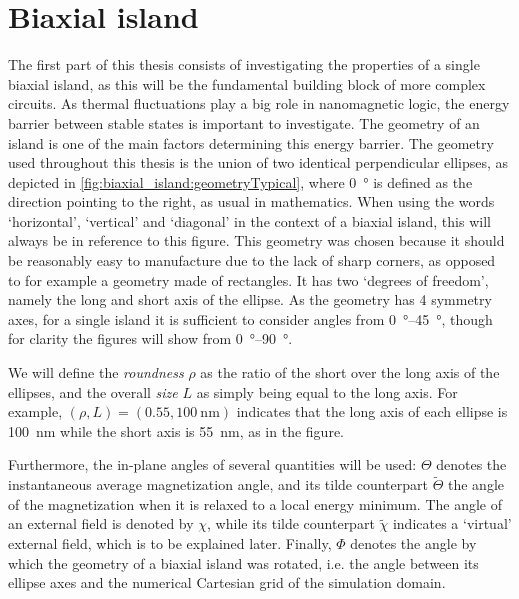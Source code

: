 \documentclass[11pt,a4paper,english]{article}
\begin{document}
\section{Biaxial island}
\label{par:Biaxial_island}
The first part of this thesis consists of investigating the properties of a single biaxial island, as this will be the fundamental building block of more complex circuits. As thermal fluctuations play a big role in nanomagnetic logic, the energy barrier between stable states is important to investigate. The geometry of an island is one of the main factors determining this energy barrier. The geometry used throughout this thesis is the union of two identical perpendicular ellipses, as depicted in \cref{fig:biaxial_island:geometryTypical}, where \SI{0}{\degree} is defined as the direction pointing to the right, as usual in mathematics. When using the words `horizontal', `vertical' and `diagonal' in the context of a biaxial island, this will always be in reference to this figure. This geometry was chosen because it should be reasonably easy to manufacture due to the lack of sharp corners, as opposed to for example a geometry made of rectangles. It has two `degrees of freedom', namely the long and short axis of the ellipse. As the geometry has 4 symmetry axes, for a single island it is sufficient to consider angles from \SIrange{0}{45}{\degree}, though for clarity the figures will show from \SIrange{0}{90}{\degree}. \par
We will define the \textit{roundness} $\rho$ as the ratio of the short over the long axis of the ellipses, and the overall \textit{size} $L$ as simply being equal to the long axis. For example, $(\rho, L)=(0.55, \SI{100}{\nano\metre})$ indicates that the long axis of each ellipse is \SI{100}{\nano\metre} while the short axis is \SI{55}{\nano\metre}, as in the figure. \par
Furthermore, the in-plane angles of several quantities will be used: $\Theta$ denotes the instantaneous average magnetization angle, and its tilde counterpart $\widetilde{\Theta}$ the angle of the magnetization when it is relaxed to a local energy minimum. The angle of an external field is denoted by $\chi$, while its tilde counterpart $\widetilde{\chi}$ indicates a `virtual' external field, which is to be explained later. Finally, $\Phi$ denotes the angle by which the geometry of a biaxial island was rotated, i.e. the angle between its ellipse axes and the numerical Cartesian grid of the simulation domain.
\end{document}
